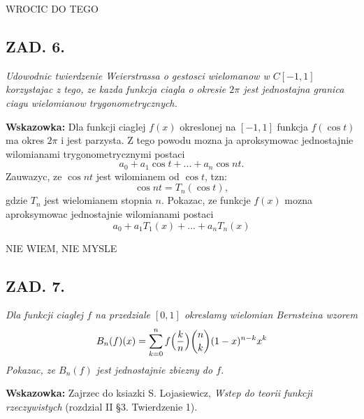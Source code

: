 \documentclass{article}
\begin{document}
    {\color{def}WROCIC DO TEGO}

    \subsection*{ZAD. 6.}

    \emph{Udowodnic twierdzenie Weierstrassa o gestosci wielomanow w $C[-1,1]$ korzystajac z tego, ze kazda funkcja ciagla o okresie $2\pi$ jest jednostajna granica ciagu wielomianow trygonometrycznych.}

    \textbf{Wskazowka:} Dla funkcji ciaglej $f(x)$ okreslonej na $[-1,1]$ funkcja $f(\cos t)$ ma okres $2\pi$ i jest parzysta. Z tego powodu mozna ja aproksymowac jednostajnie wilomianami trygonometrycznymi postaci
    $$a_0+a_1\cos t+...+a_n\cos nt.$$
    Zauwazyc, ze $\cos nt$ jest wilomianem od $\cos t$, tzn:
    $$\cos nt=T_n(\cos t),$$
    gdzie $T_n$ jest wielomianem stopnia $n$. Pokazac, ze funkcje $f(x)$ mozna aproksymowac jednostajnie wilomianami postaci
    $$a_0+a_1T_1(x)+...+a_nT_n(x)$$

    {\color{def}NIE WIEM, NIE MYSLE}

    \subsection*{ZAD. 7.}
    
    \emph{Dla funkcji ciaglej $f$ na przedziale $[0,1]$ okreslamy wielomian Bernsteina wzorem}
    $$B_n(f)(x)=\sum\limits_{k=0}^n f\Big({k\over n}\Big){n\choose k}(1-x)^{n-k}x^k$$
    \emph{Pokazac, ze $B_n(f)$ jest jednostajnie zbiezny do $f$.}

    \textbf{Wskazowka:} Zajrzec do ksiazki S. Lojasiewicz, \emph{Wstep do teorii funkcji rzeczywistych} (rozdzial II \S 3. Twierdzenie 1).
\end{document}
